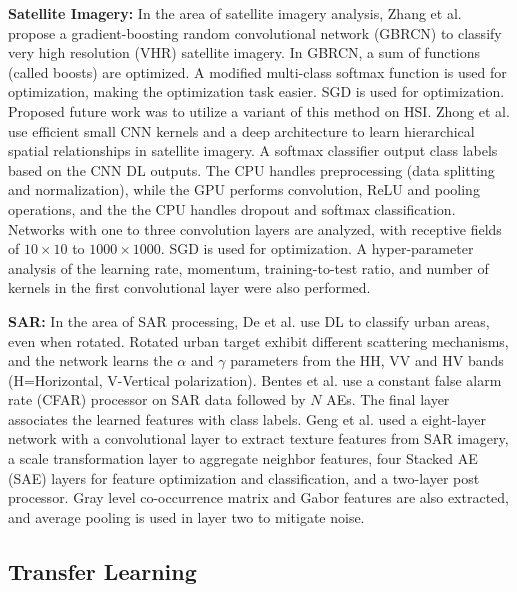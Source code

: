\documentclass[12pt]{spieman}
\begin{document}
\begin{spacing}{1}
\textbf{Satellite Imagery:} In the area of satellite imagery analysis, Zhang et al. \cite{zhang2016scene} propose a gradient-boosting random convolutional network (GBRCN) to classify very high resolution (VHR) satellite imagery. In GBRCN, a sum of functions (called boosts) are optimized. A modified multi-class softmax function is used for optimization, making the optimization task easier. SGD is used for optimization. Proposed future work was to utilize a variant of this method on HSI. Zhong et al. \cite{zhong2017satcnn} use efficient small CNN kernels and a deep architecture to learn hierarchical spatial relationships in satellite imagery. A softmax classifier output class labels based on the CNN DL outputs. The CPU handles preprocessing (data splitting and normalization), while the GPU performs convolution, ReLU and pooling operations, and the the CPU handles dropout and softmax classification. Networks with one to three convolution layers are analyzed, with receptive fields of $10 \times 10$ to $1000 \times 1000$. SGD is used for optimization. A hyper-parameter analysis of the learning rate, momentum, training-to-test ratio, and number of kernels in the first convolutional layer were also performed. 

\textbf{SAR:} In the area of SAR processing, De et al. \cite{de2015urban} use DL to classify urban areas, even when rotated. Rotated urban target exhibit different scattering mechanisms, and the network learns the $\alpha$ and $\gamma$ parameters from the HH, VV and HV bands (H=Horizontal, V-Vertical polarization). Bentes et al. \cite{bentes2015target} use a constant false alarm rate (CFAR) processor on SAR data followed by $N$ AEs. The final layer associates the learned features with class labels. Geng et al. \cite{Geng2015SAR} used a eight-layer network with a convolutional layer to extract texture features from SAR imagery, a scale transformation layer to aggregate neighbor features, four Stacked AE (SAE) layers for feature optimization and classification, and a two-layer post processor. Gray level co-occurrence matrix and Gabor features are also extracted, and average pooling is used in layer two to mitigate noise.

\subsection{Transfer Learning} 


\end{spacing}
\end{document}
